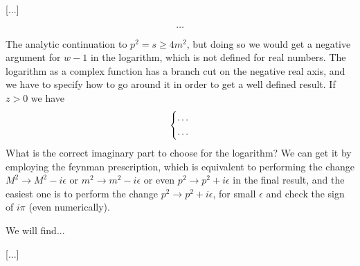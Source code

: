 [...]

\[
    \dots
\]

The analytic continuation to \(p^2 = s \geq 4m^2\), but doing so we would get a negative argument for \(w-1\) in the logarithm, which is not defined for real numbers. The logarithm as a complex function has a branch cut on the negative real axis, and we have to specify how to go around it in order to get a well defined result. If \(z>0\) we have
\[
    \begin{dcases}
        \dots \\
        \dots
    \end{dcases}
\]
What is the correct imaginary part to choose for the logarithm? We can get it by employing the feynman prescription, which is equivalent to performing the change \(M^2 \to M^2 - i \epsilon\) or \(m^2 \to m^2 - i \epsilon\) or even \(p^2 \to p^2 + i \epsilon\) in the final result, and the easiest one is to perform the change \(p^2 \to p^2 + i \epsilon\), for small \(\epsilon\) and check the sign of \(i\pi\) (even numerically).

We will find...

    [...]